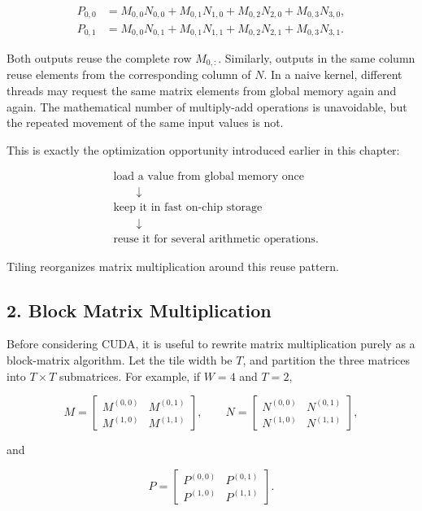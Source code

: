 \documentclass[11pt,a4paper]{article}
\begin{document}
\[
\begin{aligned}
P_{0,0}
&=
M_{0,0}N_{0,0}
+M_{0,1}N_{1,0}
+M_{0,2}N_{2,0}
+M_{0,3}N_{3,0},
\\
P_{0,1}
&=
M_{0,0}N_{0,1}
+M_{0,1}N_{1,1}
+M_{0,2}N_{2,1}
+M_{0,3}N_{3,1}.
\end{aligned}
\]

Both outputs reuse the complete row $M_{0,:}$. Similarly, outputs in the same column reuse elements from the corresponding column of $N$. In a naive kernel, different threads may request the same matrix elements from global memory again and again. The mathematical number of multiply-add operations is unavoidable, but the repeated movement of the same input values is not.

This is exactly the optimization opportunity introduced earlier in this chapter:

\[
\begin{aligned}
&\text{load a value from global memory once} \\
&\qquad\downarrow \\
&\text{keep it in fast on-chip storage} \\
&\qquad\downarrow \\
&\text{reuse it for several arithmetic operations}.
\end{aligned}
\]

Tiling reorganizes matrix multiplication around this reuse pattern.

\subsection{2. Block Matrix Multiplication}

Before considering CUDA, it is useful to rewrite matrix multiplication purely as a block-matrix algorithm. Let the tile width be $T$, and partition the three matrices into $T\times T$ submatrices. For example, if $W=4$ and $T=2$,

\[
M=
\begin{bmatrix}
M^{(0,0)} & M^{(0,1)} \\
M^{(1,0)} & M^{(1,1)}
\end{bmatrix},
\qquad
N=
\begin{bmatrix}
N^{(0,0)} & N^{(0,1)} \\
N^{(1,0)} & N^{(1,1)}
\end{bmatrix},
\]

and

\[
P=
\begin{bmatrix}
P^{(0,0)} & P^{(0,1)} \\
P^{(1,0)} & P^{(1,1)}
\end{bmatrix}.
\]
\end{document}
